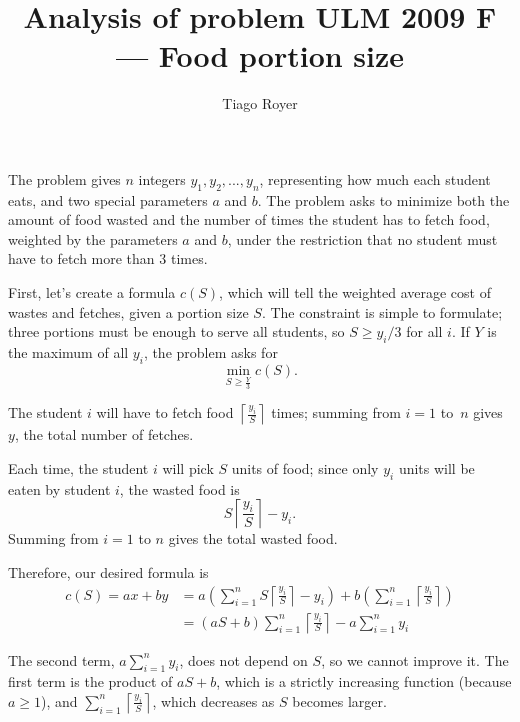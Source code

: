 \documentclass{article}
\begin{document}
\title{Analysis of problem ULM 2009 F --- Food portion size}
\date{}
\author{Tiago Royer}
\maketitle

The problem gives $n$ integers $y_1, y_2, ..., y_n$,
representing how much each student eats,
and two special parameters $a$ and $b$.
The problem asks to minimize both the amount of food wasted
and the number of times the student has to fetch food,
weighted by the parameters $a$ and $b$,
under the restriction that no student must have to fetch more than $3$ times.

First, let's create a formula $c(S)$,
which will tell the weighted average cost of wastes and fetches,
given a portion size $S$.
The constraint is simple to formulate;
three portions must be enough to serve all students,
so $S \geq y_i/3$ for all $i$.
If $Y$ is the maximum of all $y_i$, the problem asks for
\begin{equation*}
    \min_{S \geq \frac Y 3} c(S).
\end{equation*}

\newcommand\fetches{\left\lceil \frac{y_i}{S} \right\rceil}

The student $i$ will have to fetch food $\fetches$ times;
summing from $i = 1$ to~$n$ gives $y$, the total number of fetches.

Each time, the student $i$ will pick $S$ units of food;
since only $y_i$ units will be eaten by student $i$,
the wasted food is
\begin{equation*}
    S \fetches - y_i.
\end{equation*}
Summing from $i = 1$ to $n$ gives the total wasted food.

Therefore, our desired formula is
\begin{align*}
    c(S) = ax + by &=
        a\left(
            \sum_{i=1}^n S \fetches - y_i
        \right)
        +b\left(
            \sum_{i=1}^n \left\lceil \frac{y_i}{S} \right\rceil
        \right) \\
    &= (aS+b)\sum_{i=1}^n \fetches - a \sum_{i=1}^n y_i
\end{align*}

The second term,
$a\sum_{i=1}^n y_i$,
does not depend on $S$,
so we cannot improve it.
The first term is the product of $aS + b$,
which is a strictly increasing function
(because $a \geq 1$),
and $\sum_{i=1}^n \fetches$,
which decreases as $S$ becomes larger.
\end{document}

